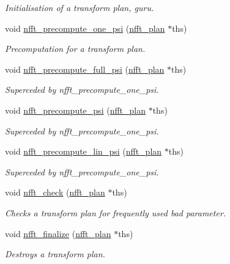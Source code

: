 \begin{CompactItemize}
\begin{CompactList}\small\item\em Initialisation of a transform plan, guru. \item\end{CompactList}\item 
void \hyperlink{group__nfft_gfd7b278b6ed04d929212b4807dd195f0}{nfft\_\-precompute\_\-one\_\-psi} (\hyperlink{structnfft__plan}{nfft\_\-plan} $\ast$ths)
\begin{CompactList}\small\item\em Precomputation for a transform plan. \item\end{CompactList}\item 
void \hyperlink{group__nfft_gee7a88956c66b2113014084d6dd04b3a}{nfft\_\-precompute\_\-full\_\-psi} (\hyperlink{structnfft__plan}{nfft\_\-plan} $\ast$ths)
\begin{CompactList}\small\item\em Superceded by nfft\_\-precompute\_\-one\_\-psi. \item\end{CompactList}\item 
void \hyperlink{group__nfft_ge6a8367b03fd75b2af42dbbaccb78bf2}{nfft\_\-precompute\_\-psi} (\hyperlink{structnfft__plan}{nfft\_\-plan} $\ast$ths)
\begin{CompactList}\small\item\em Superceded by nfft\_\-precompute\_\-one\_\-psi. \item\end{CompactList}\item 
void \hyperlink{group__nfft_g3f91a7a005cc31a8b05f33fea0507ddc}{nfft\_\-precompute\_\-lin\_\-psi} (\hyperlink{structnfft__plan}{nfft\_\-plan} $\ast$ths)
\begin{CompactList}\small\item\em Superceded by nfft\_\-precompute\_\-one\_\-psi. \item\end{CompactList}\item 
void \hyperlink{group__nfft_g7af648ae0503976536b8db18200f99fe}{nfft\_\-check} (\hyperlink{structnfft__plan}{nfft\_\-plan} $\ast$ths)
\begin{CompactList}\small\item\em Checks a transform plan for frequently used bad parameter. \item\end{CompactList}\item 
void \hyperlink{group__nfft_g614f9f7af5b0d5491afa9495393c4dc3}{nfft\_\-finalize} (\hyperlink{structnfft__plan}{nfft\_\-plan} $\ast$ths)
\begin{CompactList}\small\item\em Destroys a transform plan. \item\end{CompactList}\end{CompactItemize}


